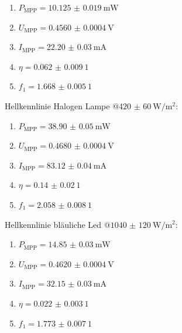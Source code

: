 \documentclass[12pt,english,ngerman]{scrartcl}
\begin{document}
\begin{enumerate}
	\item $P_\text{MPP} = \SI{10.125(19)}{\milli\watt}$
	\item $U_\text{MPP} = \SI{0.4560(4)}{\volt}$
	\item $I_\text{MPP} = \SI{22.20(3)}{\milli\ampere}$
	\item $\eta = \SI{0.062(9)}{1}$
	\item $f_1 = \SI{1.668(5)}{1}$
\end{enumerate}

Hellkennlinie Halogen Lampe $@\SI{420(60)}{\watt\per\meter\squared}$:
\begin{enumerate}
	\item $P_\text{MPP} = \SI{38.90(5)}{\milli\watt}$
	\item $U_\text{MPP} = \SI{0.4680(4)}{\volt}$
	\item $I_\text{MPP} = \SI{83.12(4)}{\milli\ampere}$
	\item $\eta = \SI{0.14(2)}{1}$
	\item $f_1 = \SI{2.058(8)}{1}$
\end{enumerate}

Hellkennlinie bläuliche Led $@\SI{1040(120)}{\watt\per\meter\squared}$:
\begin{enumerate}
	\item $P_\text{MPP} = \SI{14.85(3)}{\milli\watt}$
	\item $U_\text{MPP} = \SI{0.4620(4)}{\volt}$
	\item $I_\text{MPP} = \SI{32.15(3)}{\milli\ampere}$
	\item $\eta = \SI{0.022(3)}{1}$
	\item $f_1 = \SI{1.773(7)}{1}$
\end{enumerate}

\newpage
\printbibliography
\listoffigures
\listoftables
\end{document}
